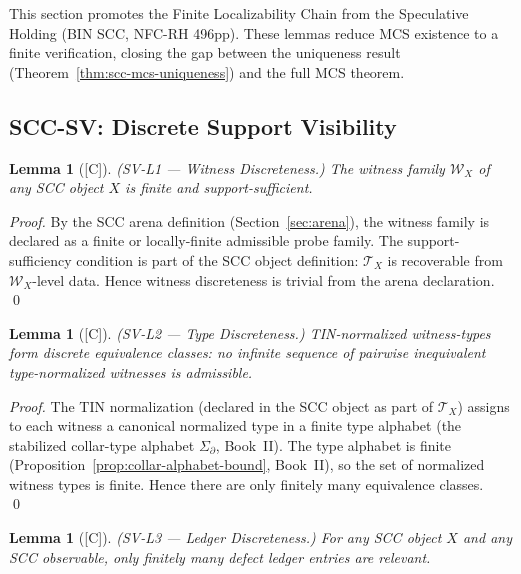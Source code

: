 \documentclass[12pt,oneside]{amsbook}
\theoremstyle{plain}
\newtheorem{lemma}[theorem]{Lemma}
\theoremstyle{definition}
\theoremstyle{remark}
\newcommand{\status}[1]{\textup{[#1]}}
\begin{document}
This section promotes the Finite Localizability Chain from the
Speculative Holding (BIN SCC, NFC-RH 496pp). These lemmas reduce
MCS existence to a finite verification, closing the gap between
the uniqueness result (Theorem~\ref{thm:scc-mcs-uniqueness}) and
the full MCS theorem.

\subsection{SCC-SV: Discrete Support Visibility}

\begin{lemma}[\status{C}]\label{lem:scc-sv-l1}
\textup{(SV-L1 --- Witness Discreteness.)}
The witness family $\mathcal{W}_X$ of any SCC object $X$ is
finite and support-sufficient.
\end{lemma}

\begin{proof}
By the SCC arena definition (Section~\ref{sec:arena}), the witness
family is declared as a finite or locally-finite admissible probe
family. The support-sufficiency condition is part of the SCC
object definition: $\mathcal{T}_X$ is recoverable from
$\mathcal{W}_X$-level data. Hence witness discreteness is trivial
from the arena declaration. \qed
\end{proof}

\begin{lemma}[\status{C}]\label{lem:scc-sv-l2}
\textup{(SV-L2 --- Type Discreteness.)}
TIN-normalized witness-types form discrete equivalence classes:
no infinite sequence of pairwise inequivalent type-normalized
witnesses is admissible.
\end{lemma}

\begin{proof}
The TIN normalization (declared in the SCC object as part of
$\mathcal{T}_X$) assigns to each witness a canonical normalized
type in a finite type alphabet (the stabilized collar-type
alphabet $\Sigma_\partial$, Book~II). The type alphabet is finite
(Proposition~\ref{prop:collar-alphabet-bound}, Book~II), so the
set of normalized witness types is finite. Hence there are only
finitely many equivalence classes. \qed
\end{proof}

\begin{lemma}[\status{C}]\label{lem:scc-sv-l3}
\textup{(SV-L3 --- Ledger Discreteness.)}
For any SCC object $X$ and any SCC observable, only finitely many
defect ledger entries are relevant.
\end{lemma}
\end{document}
